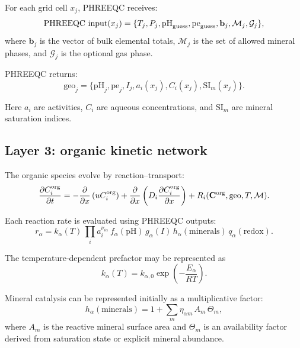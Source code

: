 \documentclass[11pt]{article}
\begin{document}
For each grid cell $x_j$, PHREEQC receives:
\begin{equation}
\text{PHREEQC input}(x_j)
=
\{
T_j, P_j, \mathrm{pH}_{\rm guess}, \mathrm{pe}_{\rm guess},
\mathbf{b}_j, \mathcal{M}_j, \mathcal{G}_j
\},
\end{equation}
where $\mathbf{b}_j$ is the vector of bulk elemental totals, $\mathcal{M}_j$ is the set of
allowed mineral phases, and $\mathcal{G}_j$ is the optional gas phase.

PHREEQC returns:
\begin{equation}
\text{geo}_j =
\{
\mathrm{pH}_j, \mathrm{pe}_j, I_j,
a_i(x_j), C_i(x_j), \mathrm{SI}_m(x_j)
\}.
\end{equation}

Here $a_i$ are activities, $C_i$ are aqueous concentrations, and $\mathrm{SI}_m$ are mineral
saturation indices.

\subsection{Layer 3: organic kinetic network}

The organic species evolve by reaction--transport:
\begin{equation}
\frac{\partial C_i^{\rm org}}{\partial t}
=
-\frac{\partial}{\partial x}
\left(u C_i^{\rm org}\right)
+
\frac{\partial}{\partial x}
\left(D_i \frac{\partial C_i^{\rm org}}{\partial x}\right)
+
R_i(\mathbf{C}^{\rm org},\text{geo},T,\mathcal{M}).
\end{equation}

Each reaction rate is evaluated using PHREEQC outputs:
\begin{equation}
r_\alpha
=
k_\alpha(T)\,
\prod_i a_i^{\nu_{i\alpha}}\,
f_\alpha(\mathrm{pH})\,
g_\alpha(I)\,
h_\alpha(\mathrm{minerals})\,
q_\alpha(\mathrm{redox}).
\end{equation}

The temperature-dependent prefactor may be represented as
\begin{equation}
k_\alpha(T)
=
k_{\alpha,0}
\exp\left(-\frac{E_{\alpha}}{RT}\right).
\end{equation}

Mineral catalysis can be represented initially as a multiplicative factor:
\begin{equation}
h_\alpha(\mathrm{minerals})
=
1
+
\sum_m
\eta_{\alpha m}\,
A_m\,
\Theta_m,
\end{equation}
where $A_m$ is the reactive mineral surface area and $\Theta_m$ is an availability factor
derived from saturation state or explicit mineral abundance.
\end{document}
